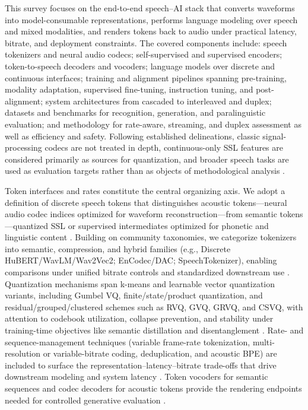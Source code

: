 This survey focuses on the end-to-end speech–AI stack that converts waveforms into model-consumable representations, performs language modeling over speech and mixed modalities, and renders tokens back to audio under practical latency, bitrate, and deployment constraints. The covered components include: speech tokenizers and neural audio codecs; self-supervised and supervised encoders; token-to-speech decoders and vocoders; language models over discrete and continuous interfaces; training and alignment pipelines spanning pre-training, modality adaptation, supervised fine-tuning, instruction tuning, and post-alignment; system architectures from cascaded to interleaved and duplex; datasets and benchmarks for recognition, generation, and paralinguistic evaluation; and methodology for rate-aware, streaming, and duplex assessment as well as efficiency and safety. Following established delineations, classic signal-processing codecs are not treated in depth, continuous-only SSL features are considered primarily as sources for quantization, and broader speech tasks are used as evaluation targets rather than as objects of methodological analysis \cite{guo2025recentadvancesdiscretespeechtokensreview}.



Token interfaces and rates constitute the central organizing axis. We adopt a definition of discrete speech tokens that distinguishes acoustic tokens—neural audio codec indices optimized for waveform reconstruction—from semantic tokens—quantized SSL or supervised intermediates optimized for phonetic and linguistic content \cite{guo2025recentadvancesdiscretespeechtokensreview}. Building on community taxonomies, we categorize tokenizers into semantic, compression, and hybrid families (e.g., Discrete HuBERT/WavLM/Wav2Vec2; EnCodec/DAC; SpeechTokenizer), enabling comparisons under unified bitrate controls and standardized downstream use \cite{mousavi2024dasbdiscreteaudiospeechbenchmark}. Quantization mechanisms span k-means and learnable vector quantization variants, including Gumbel VQ, finite/state/product quantization, and residual/grouped/clustered schemes such as RVQ, GVQ, GRVQ, and CSVQ, with attention to codebook utilization, collapse prevention, and stability under training-time objectives like semantic distillation and disentanglement \cite{guo2025recentadvancesdiscretespeechtokensreview}. Rate- and sequence-management techniques (variable frame-rate tokenization, multi-resolution or variable-bitrate coding, deduplication, and acoustic BPE) are included to surface the representation–latency–bitrate trade-offs that drive downstream modeling and system latency \cite{guo2025recentadvancesdiscretespeechtokensreview}. Token vocoders for semantic sequences and codec decoders for acoustic tokens provide the rendering endpoints needed for controlled generative evaluation .



